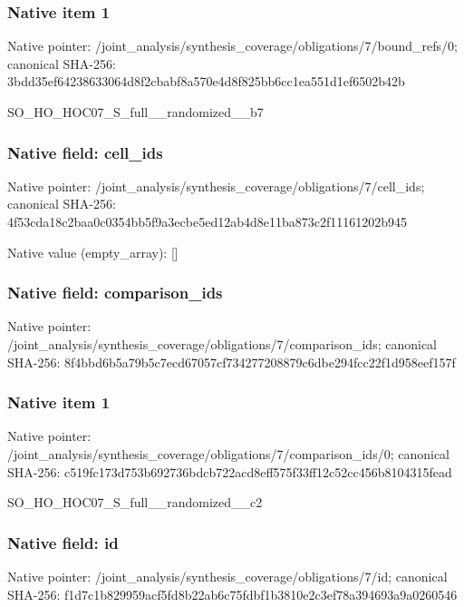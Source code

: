 \documentclass[10pt,a4paper]{article}
\begin{document}
\subsubsection{Native item 1}
Native pointer: /joint\_\allowbreak{}analysis/synthesis\_\allowbreak{}coverage/obligations/7/bound\_\allowbreak{}refs/0; canonical SHA-256: 3bdd35ef64238633064d8f2cbabf8a570e4d8f825bb6cc1ea551d1ef6502b42b

\begingroup\raggedright\sloppy SO\_\allowbreak{}HO\_\allowbreak{}HOC07\_\allowbreak{}S\_\allowbreak{}full\_\allowbreak{}\_\allowbreak{}randomized\_\allowbreak{}\_\allowbreak{}b7\par\endgroup

\subsubsection{Native field: cell\_\allowbreak{}ids}
Native pointer: /joint\_\allowbreak{}analysis/synthesis\_\allowbreak{}coverage/obligations/7/cell\_\allowbreak{}ids; canonical SHA-256: 4f53cda18c2baa0c0354bb5f9a3ecbe5ed12ab4d8e11ba873c2f11161202b945

Native value (empty\_\allowbreak{}array): []

\subsubsection{Native field: comparison\_\allowbreak{}ids}
Native pointer: /joint\_\allowbreak{}analysis/synthesis\_\allowbreak{}coverage/obligations/7/comparison\_\allowbreak{}ids; canonical SHA-256: 8f4bbd6b5a79b5c7ecd67057cf734277208879c6dbe294fcc22f1d958eef157f

\subsubsection{Native item 1}
Native pointer: /joint\_\allowbreak{}analysis/synthesis\_\allowbreak{}coverage/obligations/7/comparison\_\allowbreak{}ids/0; canonical SHA-256: c519fc173d753b692736bdcb722acd8eff575f33ff12c52cc456b8104315fead

\begingroup\raggedright\sloppy SO\_\allowbreak{}HO\_\allowbreak{}HOC07\_\allowbreak{}S\_\allowbreak{}full\_\allowbreak{}\_\allowbreak{}randomized\_\allowbreak{}\_\allowbreak{}c2\par\endgroup

\subsubsection{Native field: id}
Native pointer: /joint\_\allowbreak{}analysis/synthesis\_\allowbreak{}coverage/obligations/7/id; canonical SHA-256: f1d7c1b829959acf5fd8b22ab6c75fdbf1b3810e2c3ef78a394693a9a0260546
\end{document}
